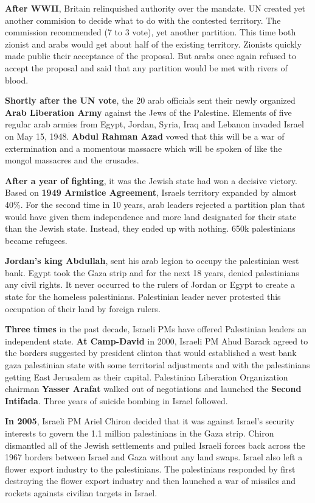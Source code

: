 \textbf{After WWII}, Britain relinquished authority over the mandate. UN created yet another commision to
decide what to do with the contested territory. The commission recommended (7 to 3 vote), yet another
partition. This time both zionist and arabs would get about half of the existing territory. Zionists quickly
made public their acceptance of the proposal. But arabs once again refused to accept the proposal and
said that any partition would be met with rivers of blood.

\textbf{Shortly after the UN vote}, the 20 arab officials sent their newly organized \textbf{Arab Liberation
Army} against the Jews of the Palestine. Elements of five regular arab armies from Egypt, Jordan, Syria,
Iraq and Lebanon invaded Israel on May 15, 1948. \textbf{Abdul Rahman Azad} vowed that this will be a war of 
extermination and a momentous massacre which will be spoken of like the mongol massacres and the crusades.

\textbf{After a year of fighting}, it was the Jewish state had won a decisive victory. Based on \textbf{1949
Armistice Agreement}, Israels territory expanded by almost 40\%. For the second time in 10 years, arab leaders
rejected a partition plan that would have given them independence and more land designated for their state
than the Jewish state. Instead, they ended up with nothing. 650k palestinians became refugees.

\textbf{Jordan's king Abdullah}, sent his arab legion to occupy the palestinian west bank. Egypt took the Gaza
strip and for the next 18 years, denied palestinians any civil rights. It never occurred to the rulers of
Jordan or Egypt to create a state for the homeless palestinians. Palestinian leader never protested this
occupation of their land by foreign rulers.

\textbf{Three times} in the past decade, Israeli PMs have offered Palestinian leaders an independent state.
\textbf{At Camp-David} in 2000, Israeli PM Ahud Barack agreed to the borders suggested by president clinton that
would established a west bank gaza palestinian state with some territorial adjustments and with the palestinians
getting East Jerusalem as their capital. Palestinian Liberation Organization chairman \textbf{Yasser Arafat} 
walked out of negotiations and launched the \textbf{Second Intifada}. Three years of suicide bombing in Israel
followed.

\textbf{In 2005}, Israeli PM Ariel Chiron decided that it was against Israel's security interests to govern the
1.1 million palestinians in the Gaza strip. Chiron dismantled all of the Jewish settlements and pulled Israeli
forces back across the 1967 borders between Israel and Gaza without any land swaps. Israel also left a flower
export industry to the palestinians. The palestinians responded by first destroying the flower export industry
and then launched a war of missiles and rockets againsts civilian targets in Israel.

